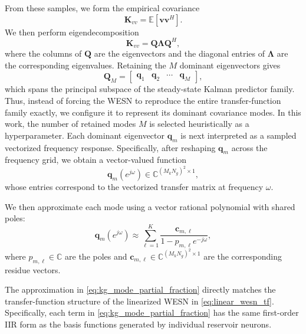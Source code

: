 \documentclass[lettersize,journal]{IEEEtran}
\begin{document}
From these samples, we form the empirical covariance
\begin{equation}
\mathbf{K}_{vv}
=
\mathbb{E}\!\left[\mathbf{v}\mathbf{v}^H\right].
\end{equation}
We then perform eigendecomposition
\begin{equation}
\mathbf{K}_{vv}
=
\mathbf{Q}\boldsymbol{\Lambda}\mathbf{Q}^H,
\end{equation}
where the columns of $\mathbf{Q}$ are the eigenvectors and the diagonal entries of $\boldsymbol{\Lambda}$ are the corresponding eigenvalues. Retaining the $M$ dominant eigenvectors gives
\begin{equation}
\mathbf{Q}_M
=
\begin{bmatrix}
\mathbf{q}_1 & \mathbf{q}_2 & \cdots & \mathbf{q}_M
\end{bmatrix},
\end{equation}
which spans the principal subspace of the steady-state Kalman predictor family. Thus, instead of forcing the WESN to reproduce the entire transfer-function family exactly, we configure it to represent its dominant covariance modes. In this work, the number of retained modes $M$ is selected heuristically as a hyperparameter.
Each dominant eigenvector $\mathbf{q}_m$ is next interpreted as a sampled vectorized frequency response. 
Specifically, after reshaping $\mathbf{q}_m$ across the frequency grid, we obtain a vector-valued function
\begin{equation}
\mathbf{q}_m(e^{j\omega})
\in
\mathbb{C}^{(M_k N_g)^2 \times 1},
\end{equation}
whose entries correspond to the vectorized transfer matrix at frequency $\omega$.

We then approximate each mode using a vector rational polynomial with shared poles:
\begin{equation}
\mathbf{q}_m(e^{j\omega})
\approx
\sum_{\ell=1}^{K}
\frac{\mathbf{c}_{m,\ell}}{1 - p_{m,\ell} e^{-j\omega}},
\label{eq:kg_mode_partial_fraction}
\end{equation}
where $p_{m,\ell} \in \mathbb{C}$ are the poles and 
$\mathbf{c}_{m,\ell} \in \mathbb{C}^{(M_k N_g)^2 \times 1}$ are the corresponding residue vectors.

The approximation in \eqref{eq:kg_mode_partial_fraction} directly matches the transfer-function structure of the linearized WESN in \eqref{eq:linear_wesn_tf}. 
Specifically, each term in \eqref{eq:kg_mode_partial_fraction} has the same first-order IIR form as the basis functions generated by individual reservoir neurons.
\end{document}
